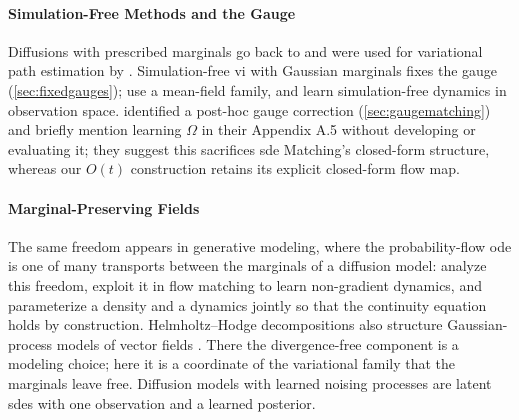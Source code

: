 \documentclass{article} %
\newcommand{\gauge}{\Omega}
\begin{document}
\paragraph{Simulation-Free Methods and the Gauge}
Diffusions with prescribed marginals go back to \citet{brigo2000sdes,brigo2002general} and were used for variational path estimation by \citet{sutter2016variational}. Simulation-free \gls{vi} with Gaussian marginals \citep{course2023amortized,course2023state,bartosh2025sde} fixes the gauge (\cref{sec:fixedgauges}); \citet{kiyohara2025neural} use a mean-field family, and \citet{neklyudov2023action,zhang2024trajectory} learn simulation-free dynamics in observation space. \citet{smith2026closing} identified a post-hoc gauge correction (\cref{sec:gaugematching}) and briefly mention learning $\gauge$ in their Appendix A.5 without developing or evaluating it; they suggest this sacrifices \gls{sde} Matching's closed-form structure, whereas our $O(t)$ construction retains its explicit closed-form flow map.

\paragraph{Marginal-Preserving Fields}
The same freedom appears in generative modeling, where the probability-flow \gls{ode} \citep{song2021score} is one of many transports between the marginals of a diffusion model: \citet{horvat2024gauge} analyze this freedom, \citet{petrovic2025curly} exploit it in flow matching \citep{lipman2023flow} to learn non-gradient dynamics, and \citet{hua2025simulation} parameterize a density and a dynamics jointly so that the continuity equation holds by construction. Helmholtz--Hodge decompositions also structure Gaussian-process models of vector fields \citep{berlinghieri2023gaussian,xu2024hhd}. There the divergence-free component is a modeling choice; here it is a coordinate of the variational family that the marginals leave free. Diffusion models with learned noising processes \citep{singhal2023where,bartosh2024neural,nielsen2024diffenc,sahoo2024diffusion,bartosh2024neuralflow,du2024doob} are latent \glspl{sde} with one observation and a learned posterior.
\end{document}
